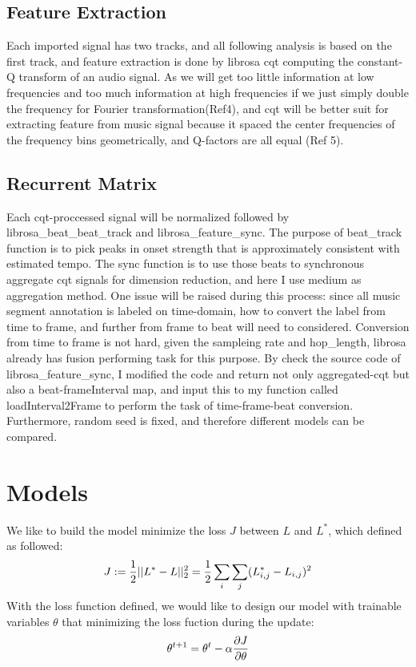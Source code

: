 \documentclass[final]{siamltexmm}
\begin{document}
\subsection{Feature Extraction}
Each imported signal has two tracks, and all following analysis is based on the first track, and feature extraction is done by librosa cqt computing the constant-Q transform of an audio signal. As we will get too little information at low frequencies and too much information at high frequencies if we just simply double the frequency for Fourier transformation(Ref4), and cqt will be better suit for extracting feature from music signal because it spaced the center frequencies of the frequency bins geometrically, and Q-factors are all equal (Ref 5).

\subsection{Recurrent Matrix}
Each cqt-proccessed signal will be normalized followed by librosa\_beat\_beat\_track and librosa\_feature\_sync. The purpose of beat\_track function is to pick peaks in onset strength that  is approximately consistent with estimated tempo. The sync function is to use those beats to synchronous aggregate cqt signals for dimension reduction, and here I use medium as aggregation method. One issue will be raised during this process: since all music segment annotation is labeled on time-domain, how to convert the label from time to frame, and further from frame to beat will need to considered. Conversion from time to frame is not hard, given the sampleing rate and hop\_length, librosa already has fusion performing task for this purpose. By check the source code of librosa\_feature\_sync, I modified the code and return not only aggregated-cqt but also a beat-frameInterval map, and input this to my function called loadInterval2Frame to perform the task of time-frame-beat conversion. Furthermore, random seed is fixed, and therefore different models can be compared.
\section{Models}
We like to build the model minimize the loss $J$ between $L$ and $L^{\ast}$, which defined as followed:
\begin{equation}
J := {1 \over 2} || L^{\ast} - L ||^2_2
=
{1 \over 2}
\sum_{\substack{i}}
\sum_{\substack{j}}
(L^{\ast}_{i,j} - L_{i,j})^2
\end{equation}
With the loss function defined, we would like to design our model with trainable variables $\theta$ that minimizing the loss fuction during the update:
\begin{equation}
\theta^{t+1} = \theta^{t} - \alpha {\partial J \over \partial \theta}
\end{equation}
\end{document}
